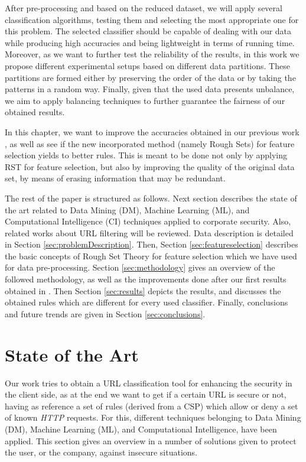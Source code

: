 \documentclass{llncs}
\begin{document}
After pre-processing and based on the reduced dataset, we will apply several classification algorithms,
testing them and selecting the most appropriate one for this problem. The selected classifier should be capable
of dealing with our data while producing high accuracies and
being lightweight in terms of running time. Moreover, as we want to further test the reliability of the results,
in this work we propose different experimental setups based on different data
partitions. These partitions are formed either by preserving the order of the data or by taking the patterns in
a random way. Finally, given that the used data presents unbalance, we aim to apply balancing
techniques \cite{imbalance_techniques_02} to further guarantee the fairness of our obtained results.

In this chapter, we want to improve the accuracies obtained in our previous work \cite{ECTA},
as well as see if the new incorporated method (namely Rough Sets) for feature selection yields to better rules.
This is meant to be done not only by applying RST for feature selection, but also by improving the quality of the
original data set, by means of erasing information that may be redundant.

The rest of the paper is structured as follows. Next section describes the state of the art related
to Data Mining (DM), Machine Learning (ML), and Computational Intelligence (CI) techniques applied
to corporate security. Also, related works about URL filtering will be reviewed. Data  description is
detailed in Section \ref{sec:problemDescription}. Then, Section \ref{sec:featureselection} describes the
basic concepts of Rough Set Theory for feature selection which we  have used for data pre-processing.
Section \ref{sec:methodology} gives an overview of the  followed methodology, as well as the improvements
done after our  first results obtained in \cite{ECTA}. Then Section \ref{sec:results} depicts the results, and discusses the  obtained rules which are different for every used classifier. Finally, conclusions and future trends are given in Section \ref{sec:conclusions}.

%
\section{State of the Art}
\label{sec:stateofart}

\noindent Our work tries to obtain a URL classification tool for
enhancing the security in the client side, as at the end we want to
get if a certain URL is secure or not, having as reference a set of
rules (derived from a CSP) which allow or deny a set of known
\textit{HTTP} requests. For this, different techniques belonging to
Data Mining (DM), Machine Learning (ML), and Computational
Intelligence, have been applied. This section gives  an overview in a
number of solutions given to protect the user, or the company, against
insecure situations.
\end{document}
